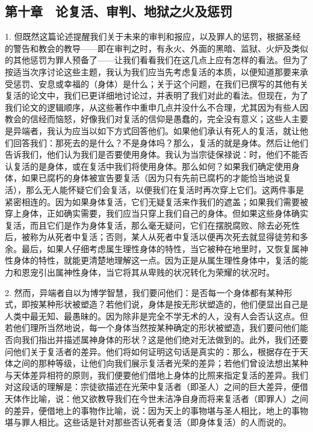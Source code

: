 
\subsection{第十章　论复活、审判、地狱之火及惩罚}

1. 但既然这篇论述提醒我们关于未来的审判和报应，以及罪人的惩罚，根据圣经的警告和教会的教导——即在审判之时，有永火、外面的黑暗、监狱、火炉及类似的其他惩罚为罪人预备了——让我们看看我们在这几点上应有怎样的看法。但为了按适当次序讨论这些主题，我认为我们应当先考虑复活的本质，以便知道那要来承受惩罚、安息或幸福的（身体）是什么；关于这个问题，在我们已撰写的其他有关复活的论文中，我们已更详细地讨论过，并表明了我们对此的看法。但现在，为了我们论文的逻辑顺序，从这些著作中重申几点并没什么不合理，尤其因为有些人因教会的信经而恼怒，好像我们对复活的信仰是愚蠢的，完全没有意义；这些人主要是异端者，我认为应当以如下方式回答他们。如果他们承认有死人的复活，就让他们回答我们：那死去的是什么？不是身体吗？那么，复活的就是身体。然后让他们告诉我们，他们认为我们是否要使用身体。我认为当宗徒保禄说：时，他们不能否认复活的是身体，或在复活中我们将使用身体。那么如何？如果我们确定使用身体，如果已腐朽的身体被宣告要复活（因为只有先前已腐朽的才能恰当地说复活），那么无人能怀疑它们会复活，以便我们在复活时再次穿上它们。这两件事是紧密相连的。因为如果身体复活，它们无疑复活来作我们的遮盖；如果我们需要被穿上身体，正如确实需要，我们应当只穿上我们自己的身体。但如果这些身体确实复活，而且它们是作为身体复活，那么毫无疑问，它们在摆脱腐败、除去必死性后，被称为从死者中复活；否则，某人从死者中复活以便再次死去就显得徒劳和多余。最后，如果人仔细考虑属生理性身体的特性，当它被种在地里时，又恢复属神性身体的特性，就能更清楚地理解这一点。因为正是从属生理性身体中，复活的能力和恩宠引出属神性身体，当它将其从卑贱的状况转化为荣耀的状况时。\par

2. 然而，异端者自以为博学智慧，我们要问他们：是否每一个身体都有某种形式，即按某种形状被塑造？若他们说，身体是按无形状塑造的，他们便显出自己是人类中最无知、最愚昧的。因为除非是完全不学无术的人，没有人会否认这点。但若他们理所当然地说，每一个身体当然按某种确定的形状被塑造，我们要问他们能否向我们指出并描述属神身体的形状？这是他们绝对无法做到的。此外，我们还要问他们关于复活者的差异。他们将如何证明这句话是真实的：那么，根据存在于天体之间的那种等级，让他们向我们展示复活者光荣的差异；若他们曾设法想出某种与天体差异相符的原则，我们便要他们借地上身体的比照来指定复活的差异。我们对这段话的理解是：宗徒欲描述在光荣中复活者（即圣人）之间的巨大差异，便借天体作比喻，说：他又欲教导我们在今世未洁净自身而将来复活者（即罪人）之间的差异，便借地上的事物作比喻，说：因为天上的事物堪与圣人相比，地上的事物堪与罪人相比。这些话是针对那些否认死者复活（即身体复活）的人而说的。\par

